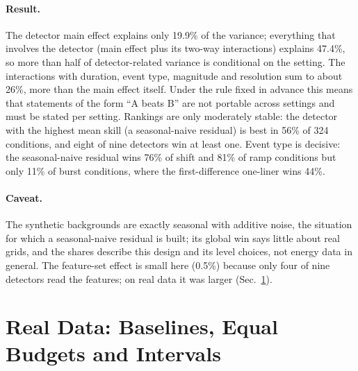 \documentclass[10pt,twocolumn]{article}
\begin{document}
\begin{table}[t]
\centering\scriptsize

\caption{Share of the variance of detector skill (648 datasets, 9 detectors, 2 feature sets). Terms not shown are below 1\%. Bootstrap intervals over the four replicates are within about 1.5 percentage points for every listed term.}\label{tab:factorial}
\end{table}

\paragraph{Result.} The detector main effect explains only 19.9\% of the variance; everything that involves the detector (main effect plus its two-way interactions) explains 47.4\%, so more than half of detector-related variance is conditional on the setting. The interactions with duration, event type, magnitude and resolution sum to about 26\%, more than the main effect itself. Under the rule fixed in advance this means that statements of the form ``A beats B'' are not portable across settings and must be stated per setting. Rankings are only moderately stable: the detector with the highest mean skill (a seasonal-naive residual) is best in 56\% of 324 conditions, and eight of nine detectors win at least one. Event type is decisive: the seasonal-naive residual wins 76\% of shift and 81\% of ramp conditions but only 11\% of burst conditions, where the first-difference one-liner wins 44\%.
\paragraph{Caveat.} The synthetic backgrounds are exactly seasonal with additive noise, the situation for which a seasonal-naive residual is built; its global win says little about real grids, and the shares describe this design and its level choices, not energy data in general. The feature-set effect is small here (0.5\%) because only four of nine detectors read the features; on real data it was larger (Sec.~\ref{sec:real}).

\section{Real Data: Baselines, Equal Budgets and Intervals}\label{sec:real}
\end{document}
